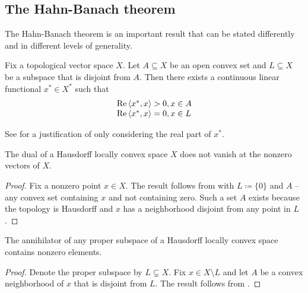 \subsection{The Hahn-Banach theorem}\label{subsec:hahn_banach}

The Hahn-Banach theorem is an important result that can be stated differently and in different levels of generality.

\begin{theorem}\label{thm:geometric_hahn_banach}\cite[24]{Йоффе1974}
  Fix a topological vector space \( X \). Let \( A \subseteq X \) be an open convex set and \( L \subseteq X \) be a subspace that is disjoint from \( A \). Then there exists a continuous linear functional \( x^* \in X^* \) such that
  \begin{equation*}
    \begin{array}{l}
      \operatorname{Re} \left\langle x^*, x \right\rangle > 0, x \in A \\
      \operatorname{Re} \left\langle x^*, x \right\rangle = 0, x \in L
    \end{array}
  \end{equation*}

  See  for a justification of only considering the real part of \( x^* \).
\end{theorem}

\begin{corollary}\label{thm:hahn_banach_implies_functionals_vanish_nowhere}\cite[24]{Йоффе1974}
  The dual of a Hausdorff locally convex space \( X \) does not vanish at the nonzero vectors of \( X \).
\end{corollary}
\begin{proof}
  Fix a nonzero point \( x \in X \). The result follows from  with \( L \coloneqq \{ 0 \} \) and \( A \) -- any convex set containing \( x \) and not containing zero. Such a set \( A \) exists because the topology is Hausdorff and \( x \) has a neighborhood disjoint from any point in \( L \).
\end{proof}

\begin{corollary}\label{thm:hahn_banach_implies_annihilator_nontrivial}\cite[25]{Йоффе1974}
  The annihilator of any proper subspace of a Hausdorff locally convex space contains nonzero elements.
\end{corollary}
\begin{proof}
  Denote the proper subspace by \( L \subsetneq X \). Fix \( x \in X \setminus L \) and let \( A \) be a convex neighborhood of \( x \) that is disjoint from \( L \). The result follows from .
\end{proof}

